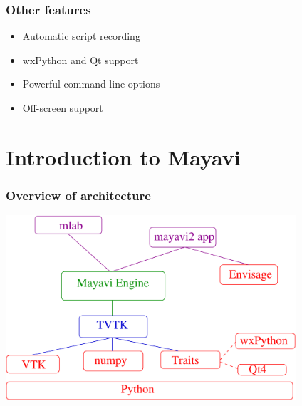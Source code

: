\begin{frame}[plain]
  \begin{center}
  \end{center}
\end{frame}

\begin{frame}[plain]
\end{frame}

\begin{frame}[plain]
\end{frame}

\begin{frame}[plain]
\end{frame}


\begin{frame}
  \frametitle{Other features}
  \Large
  \begin{itemize}
  \item Automatic script recording
  \item wxPython and Qt support
  \item Powerful command line options
  \item Off-screen support
  \end{itemize}
\end{frame}

\section{Introduction to Mayavi}

\begin{frame}[plain]
  \frametitle{Overview of architecture}
    \includegraphics[width=4.25in]{MEDIA/m2/layers.pdf}

\end{frame}


